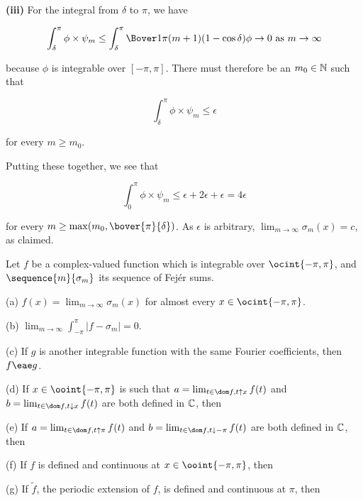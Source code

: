 {\medskip

{\bf (iii)} For the integral from $\delta$ to $\pi$, we have

$$\int_{\delta}^{\pi}\phi\times\psi_m
\le\int_{\delta}^{\pi}\Bover1{\pi(m+1)(1-\cos\delta)}\phi
\to 0\text{ as }m\to\infty$$

\noindent because $\phi$ is integrable over $[-\pi,\pi]$.   There must
therefore be an $m_0\in\Bbb N$ such that

$$\int_{\delta}^{\pi}\phi\times\psi_m\le\epsilon$$

\noindent for every $m\ge m_0$.

\medskip

Putting these together, we see that

$$\int_0^{\pi}\phi\times\psi_m
\le\epsilon+2\epsilon
+\epsilon= 4\epsilon$$

\noindent for every $m\ge \max(m_0,\bover{\pi}{\delta})$.   As
$\epsilon$ is arbitrary,
$\lim_{m\to\infty}\sigma_m(x)=c$, as claimed.
}%

 Let $f$ be a complex-valued
function which is integrable over $\ocint{-\pi,\pi}$, and
$\sequence{m}{\sigma_m}$ its
sequence of Fej\'er sums.

(a) $f(x)=\lim_{m\to\infty}\sigma_m(x)$ for almost every
$x\in\ocint{-\pi,\pi}$.

(b) $\lim_{m\to\infty}\int_{-\pi}^{\pi}|f-\sigma_m|=0$.

(c) If $g$ is another integrable function with the same Fourier
coefficients, then $f\eae g$.

(d) If $x\in\ooint{-\pi,\pi}$ is such that
$a=\lim_{t\in\dom f,t\uparrow
x}f(t)$ and $b=\lim_{t\in\dom f,t\downarrow x}f(t)$ are both defined in
$\Bbb C$, then


(e) If $a=\lim_{t\in\dom f,t\uparrow \pi}f(t)$ and $b=\lim_{t\in\dom
f,t\downarrow -\pi}f(t)$ are both defined in $\Bbb C$, then


(f) If $f$ is defined and continuous at $x\in\ooint{-\pi,\pi}$, then


(g) If $\tilde f$, the periodic extension of $f$, is defined and
continuous at $\pi$, then


